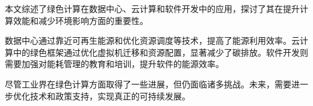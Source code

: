 \begin{abstractzh}

本文综述了绿色计算在数据中心、云计算和软件开发中的应用，探讨了其在提升计算效能和减少环境影响方面的重要性。

数据中心通过靠近可再生能源和优化资源调度等技术，提高了能源利用效率。云计算中的绿色框架通过优化虚拟机迁移和资源配置，显著减少了碳排放。软件开发则需要加强对能耗管理的教育和培训，提升软件的能源效率。

尽管工业界在绿色计算方面取得了一些进展，但仍面临诸多挑战。未来，需要进一步优化技术和政策支持，实现真正的可持续发展。

\end{abstractzh}